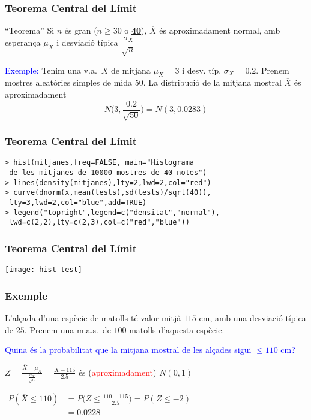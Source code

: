 \documentclass[12pt,t]{beamer}
\newcommand{\red}[1]{\textcolor{red}{#1}}
\newcommand{\blue}[1]{\textcolor{blue}{#1}}
\renewcommand{\emph}[1]{{\color{red}#1}}
\renewcommand{\leq}{\leqslant}
\renewcommand{\geq}{\geqslant}
\theoremstyle{plain}
\theoremstyle{definition}
\begin{document}
\begin{frame}
\frametitle{Teorema Central del Límit}

\begin{block}{``Teorema''}
Si $n$ és gran (\emph{$n\geq 30$ o \underline{\textbf{40}}}), $\overline{X}$ és aproximadament normal, amb esperança $\mu_X$ i desviació típica $\dfrac{\sigma_X}{\sqrt{n}}$
\end{block}
\bigskip

\blue{Exemple:} Tenim una v.a.\ $X$ de mitjana $\mu_X=3$ i desv. típ. $\sigma_X=0.2$. Prenem mostres aleatòries simples de mida 50. La distribució de la mitjana mostral $\overline{X}$ és aproximadament
$$
N\Big(3,\frac{0.2}{\sqrt{50}}\Big)=N(3,0.0283)
$$
\end{frame}

\begin{frame}[fragile]
\frametitle{Teorema Central del Límit}
\small

\begin{verbatim}
> hist(mitjanes,freq=FALSE, main="Histograma 
 de les mitjanes de 10000 mostres de 40 notes")
> lines(density(mitjanes),lty=2,lwd=2,col="red")
> curve(dnorm(x,mean(tests),sd(tests)/sqrt(40)),
 lty=3,lwd=2,col="blue",add=TRUE)
> legend("topright",legend=c("densitat","normal"),
 lwd=c(2,2),lty=c(2,3),col=c("red","blue"))
\end{verbatim}

\end{frame}

\begin{frame}
\frametitle{Teorema Central del Límit}
\vspace*{-4ex}

\begin{center}
\texttt{[image: hist-test]}
\end{center}



\end{frame}




\begin{frame}
\frametitle{Exemple}
\vspace*{-2ex}

L'alçada d'una espècie de matolls té valor mitjà  $115$ cm, amb una desviació típica de $25$. Prenem una m.a.s.\ de $100$ matolls d'aquesta espècie.
\medskip

\blue{Quina és la probabilitat que la mitjana mostral de les alçades sigui $\leq 110$ cm?}
\medskip

$\displaystyle Z=\frac{\overline{X}-\mu_{X}}{\frac{\sigma_{X}}{\sqrt{n}}}=
\frac{\overline{X}-115}{2.5}$ és (\red{aproximadament}) $N(0,1)$
\medskip

$\begin{array}{rl}
P(\overline{X}\leq 110)  &\displaystyle= P\Big(Z\leq \frac{110-115}{2.5}\Big)= P(Z\leq -2)\\[2ex]
& \displaystyle=0.0228
\end{array}$


\end{frame}
\end{document}
